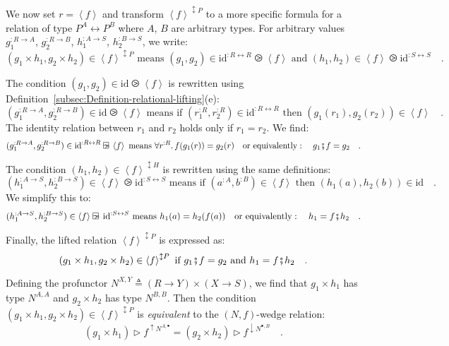 We now set $r=\left<f\right>$ and transform $\left<f\right>^{\updownarrow P}$
to a more specific formula for a relation of type $P^{A}\leftrightarrow P^{B}$
where $A$, $B$ are arbitrary types. For arbitrary values $g_{1}^{:R\rightarrow A}$,
$g_{2}^{:R\rightarrow B}$, $h_{1}^{:A\rightarrow S}$, $h_{2}^{:B\rightarrow S}$,
we write:
\[
(g_{1}\times h_{1},g_{2}\times h_{2})\in\left<f\right>^{\updownarrow P}\text{ means }(g_{1},g_{2})\in\text{id}^{:R\leftrightarrow R}\ogreaterthan\left<f\right>\text{ and }(h_{1},h_{2})\in\left<f\right>\ogreaterthan\text{id}^{:S\leftrightarrow S}\quad.
\]

The condition $(g_{1},g_{2})\in\text{id}\ogreaterthan\left<f\right>$
is rewritten using Definition~\ref{subsec:Definition-relational-lifting}(e):
\[
(g_{1}^{:R\rightarrow A},g_{2}^{:R\rightarrow B})\in\text{id}\ogreaterthan\left<f\right>\text{ means if }(r_{1}^{:R},r_{2}^{:R})\in\text{id}^{:R\leftrightarrow R}\text{ then }(g_{1}(r_{1}),g_{2}(r_{2}))\in\left<f\right>\quad.
\]
The identity relation between $r_{1}$ and $r_{2}$ holds only if
$r_{1}=r_{2}$. We find:
\[
(g_{1}^{:R\rightarrow A},g_{2}^{:R\rightarrow B})\in\text{id}^{:R\leftrightarrow R}\ogreaterthan\left<f\right>\text{ means }\forall r^{:R}.\,f(g_{1}(r))=g_{2}(r)\quad\text{or equivalently}:\quad g_{1}\bef f=g_{2}\quad.
\]

The condition $(h_{1},h_{2})\in\left<f\right>^{\updownarrow H}$ is
rewritten using the same definitions:
\[
(h_{1}^{:A\rightarrow S},h_{2}^{:B\rightarrow S})\in\left<f\right>\ogreaterthan\text{id}^{:S\leftrightarrow S}\text{ means if }(a^{:A},b^{:B})\in\left<f\right>\text{ then }(h_{1}(a),h_{2}(b))\in\text{id}\quad.
\]
We simplify this to:
\[
(h_{1}^{:A\rightarrow S},h_{2}^{:B\rightarrow S})\in\left<f\right>\ogreaterthan\text{id}^{:S\leftrightarrow S}\text{ means }h_{1}(a)=h_{2}(f(a))\quad\text{or equivalently}:\quad h_{1}=f\bef h_{2}\quad.
\]

Finally, the lifted relation $\left<f\right>^{\updownarrow P}$ is
expressed as:
\[
(g_{1}\times h_{1},g_{2}\times h_{2})\in\left<f\right>^{\updownarrow P}\text{ if }g_{1}\bef f=g_{2}\text{ and }h_{1}=f\bef h_{2}\quad.
\]

Defining the profunctor $N^{X,Y}\triangleq\left(R\rightarrow Y\right)\times\left(X\rightarrow S\right)$,
we find that $g_{1}\times h_{1}$ has type $N^{A,A}$ and $g_{2}\times h_{2}$
has type $N^{B,B}$. Then the condition $(g_{1}\times h_{1},g_{2}\times h_{2})\in\left<f\right>^{\updownarrow P}$
is \emph{equivalent} to the $\left(N,f\right)$-wedge relation:
\[
(g_{1}\times h_{1})\triangleright f^{\uparrow N^{A,\bullet}}=(g_{2}\times h_{2})\triangleright f^{\downarrow N^{\bullet,B}}\quad.
\]

